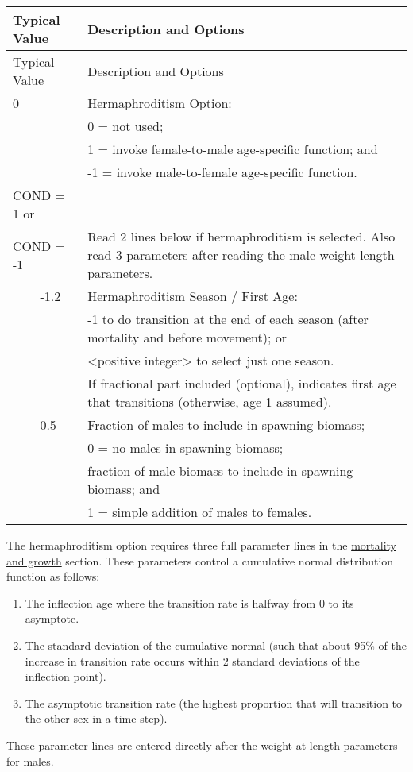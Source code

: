 \begin{longtable}{p{0.5cm} p{2cm} p{13cm}}
	\hline	
	\multicolumn{2}{l}{Typical Value} & Description and Options \Tstrut\Bstrut\\
	\hline
	\endfirsthead

	\hline
	\multicolumn{2}{l}{Typical Value} & Description and Options \Tstrut\Bstrut\\
	\hline
	\endhead
	\hline

	\endfoot
	
	\endlastfoot

	0 & & Hermaphroditism Option: \Tstrut\\
	 &  & 0 = not used; \\
	 &  & 1 = invoke female-to-male age-specific function; and \\
	 &  & -1 = invoke male-to-female age-specific function.\Bstrut\\
	\hline

	\multicolumn{2}{l}{COND = 1 or} \Tstrut & \\
	\multicolumn{2}{l}{COND = -1} & Read 2 lines below if hermaphroditism is selected. Also read 3 parameters after reading the male weight-length parameters. \Bstrut\\
	& -1.2 & Hermaphroditism Season / First Age: \\
	&     & -1 to do transition at the end of each season (after mortality and before movement); or \\
	&     & <positive integer> to select just one season. \\
    &	  & If fractional part included (optional), indicates first age that transitions (otherwise, age 1 assumed). \\
	& 0.5 & Fraction of males to include in spawning biomass; \\
	&     & 0 = no males in spawning biomass; \\
	&     & fraction of male biomass to include in spawning biomass; and \\
	&     & 1 = simple addition of males to females. \Bstrut\\
	\hline
\end{longtable}
\vspace*{-\baselineskip}

The hermaphroditism option requires three full parameter lines in the \hyperlink{HermaphroditeBiology}{mortality and growth} section. These parameters control a cumulative normal distribution function as follows:
\begin{enumerate}
	\item The inflection age where the transition rate is halfway from 0 to its asymptote.
	\item The standard deviation of the cumulative normal (such that about 95\% of the increase in transition rate occurs within 2 standard deviations of the inflection point).
	\item The asymptotic transition rate (the highest proportion that will transition to the other sex in a time step).
\end{enumerate}
These parameter lines are entered directly after the weight-at-length parameters for males.

